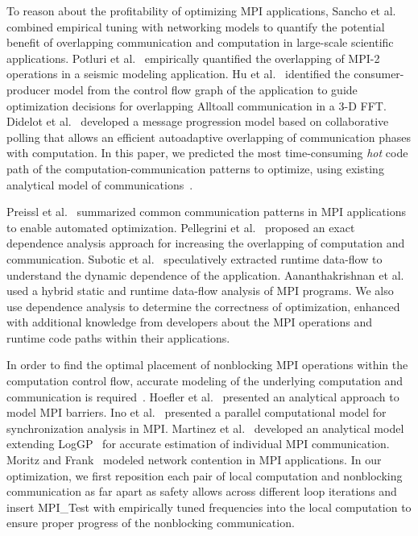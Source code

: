 To reason about the profitability of optimizing MPI applications,
Sancho et al.~\cite{sancho:sc06} combined empirical tuning with
networking models to quantify the potential benefit of overlapping
communication and computation in large-scale scientific applications.
Potluri et al.~\cite{potluri:ics10} empirically quantified the
overlapping of MPI-2 operations in a seismic modeling application.  Hu
et al.~\cite{hu:npc08,song:ppopp14} identified the consumer-producer
model from the control flow graph of the application to guide
optimization decisions for overlapping Alltoall communication in a 3-D
FFT.  Didelot et al.~\cite{didelot:imc14,didelot:eurompi12} developed
a message progression model based on collaborative polling that allows
an efficient autoadaptive overlapping of communication phases with
computation.  In this paper, we predicted the most time-consuming
\emph{hot} code path of the computation-communication patterns to
optimize, using existing analytical model of
communications~\cite{loggp}.

Preissl et al.~\cite{preissl:tms10} summarized common communication
patterns in MPI applications to enable automated optimization.
Pellegrini et al.~\cite{pellegrini:eurompi12} proposed an exact
dependence analysis approach for increasing the overlapping of
computation and communication.  Subotic et al.~\cite{subotic:hipeac08}
speculatively extracted runtime data-flow to understand the dynamic
dependence of the application.  Aananthakrishnan et
al.~\cite{aananthakrishnan:ics13} used a hybrid static and runtime
data-flow analysis of MPI programs.  We also use dependence analysis
to determine the correctness of optimization, enhanced with additional
knowledge from developers about the MPI operations and runtime code
paths within their applications.

In order to find the optimal placement of nonblocking MPI operations
within the computation control flow, accurate modeling of the
underlying computation and communication is
required~\cite{brightwell:ics04}.  Hoefler et
al.~\cite{hoefler:icppw05} presented an analytical approach to model
MPI barriers.  Ino et al.~\cite{ino:ppopp2001} presented a parallel
computational model for synchronization analysis in MPI.  Martinez et
al.~\cite{martinez:ipdps09} developed an analytical model extending
LogGP~\cite{loggp} for accurate estimation of individual MPI
communication.  Moritz and Frank~\cite{moritz:tpds01} modeled network
contention in MPI applications.  In our optimization, we first
reposition each pair of local computation and nonblocking
communication as far apart as safety allows across different loop
iterations and insert MPI\_Test with empirically tuned frequencies
into the local computation to ensure proper progress of the
nonblocking communication.
